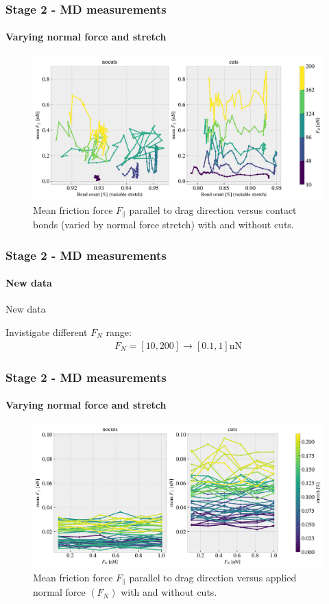 \documentclass[
	10pt, %
]{beamer}
\begin{document}
\begin{frame}
	\frametitle{Stage 2 - MD measurements}
	\framesubtitle{Varying normal force and stretch}
	\begin{figure}
		\includegraphics[width=\linewidth]{figures/multi6.pdf}
		\caption{Mean friction force $F_{\parallel}$ parallel to drag direction versus contact bonds (varied by normal force stretch) with and without cuts.}
	\end{figure}	
\end{frame}




\begin{frame}
	\frametitle{Stage 2 - MD measurements}
	\framesubtitle{New data}

	{\Large New data} 
	\newline

	Invistigate different $F_N$ range:
	\begin{align*}
		F_N = [10, 200] \rightarrow [0.1, 1] \text{nN} 
	\end{align*}

\end{frame}




\begin{frame}
	\frametitle{Stage 2 - MD measurements}
	\framesubtitle{Varying normal force and stretch}
	\begin{figure}
		\includegraphics[width=\linewidth]{figures/multi_lowFN0.pdf}
		\caption{Mean friction force $F_{\parallel}$ parallel to drag direction versus applied normal force $(F_N)$ with and without cuts.}
	\end{figure}	
\end{frame}
\end{document}
